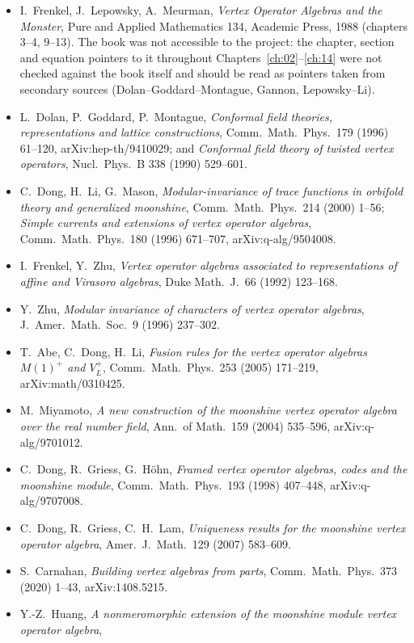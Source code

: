 \begin{itemize}
\item I.~Frenkel, J.~Lepowsky, A.~Meurman, \emph{Vertex Operator Algebras and the Monster}, Pure and
  Applied Mathematics 134, Academic Press, 1988 (chapters 3--4, 9--13). The book was not accessible to the project:
  the chapter, section and equation pointers to it throughout Chapters~\ref{ch:02}--\ref{ch:14} were not checked against
  the book itself and should be read as pointers taken from secondary sources (Dolan--Goddard--Montague, Gannon,
  Lepowsky--Li).
\item L.~Dolan, P.~Goddard, P.~Montague, \emph{Conformal field theories, representations and lattice
  constructions}, Comm.\ Math.\ Phys.\ 179 (1996) 61--120, arXiv:hep-th/9410029; and \emph{Conformal
  field theory of twisted vertex operators}, Nucl.\ Phys.\ B 338 (1990) 529--601.
\item C.~Dong, H.~Li, G.~Mason, \emph{Modular-invariance of trace functions in orbifold theory and
  generalized moonshine}, Comm.\ Math.\ Phys.\ 214 (2000) 1--56; \emph{Simple currents and extensions
  of vertex operator algebras}, Comm.\ Math.\ Phys.\ 180 (1996) 671--707, arXiv:q-alg/9504008.
\item I.~Frenkel, Y.~Zhu, \emph{Vertex operator algebras associated to representations of affine and
  Virasoro algebras}, Duke Math.\ J.\ 66 (1992) 123--168.
\item Y.~Zhu, \emph{Modular invariance of characters of vertex operator algebras}, J.\ Amer.\ Math.\
  Soc.\ 9 (1996) 237--302.
\item T.~Abe, C.~Dong, H.~Li, \emph{Fusion rules for the vertex operator algebras $M(1)^+$ and
  $V_L^+$}, Comm.\ Math.\ Phys.\ 253 (2005) 171--219, arXiv:math/0310425.
\item M.~Miyamoto, \emph{A new construction of the moonshine vertex operator algebra over the real
  number field}, Ann.\ of Math.\ 159 (2004) 535--596, arXiv:q-alg/9701012.
\item C.~Dong, R.~Griess, G.~H\"ohn, \emph{Framed vertex operator algebras, codes and the moonshine
  module}, Comm.\ Math.\ Phys.\ 193 (1998) 407--448, arXiv:q-alg/9707008.
\item C.~Dong, R.~Griess, C.~H.~Lam, \emph{Uniqueness results for the moonshine vertex operator
  algebra}, Amer.\ J.\ Math.\ 129 (2007) 583--609.
\item S.~Carnahan, \emph{Building vertex algebras from parts}, Comm.\ Math.\ Phys.\ 373 (2020) 1--43,
  arXiv:1408.5215.
\item Y.-Z.~Huang, \emph{A nonmeromorphic extension of the moonshine module vertex operator algebra},

\end{itemize}
